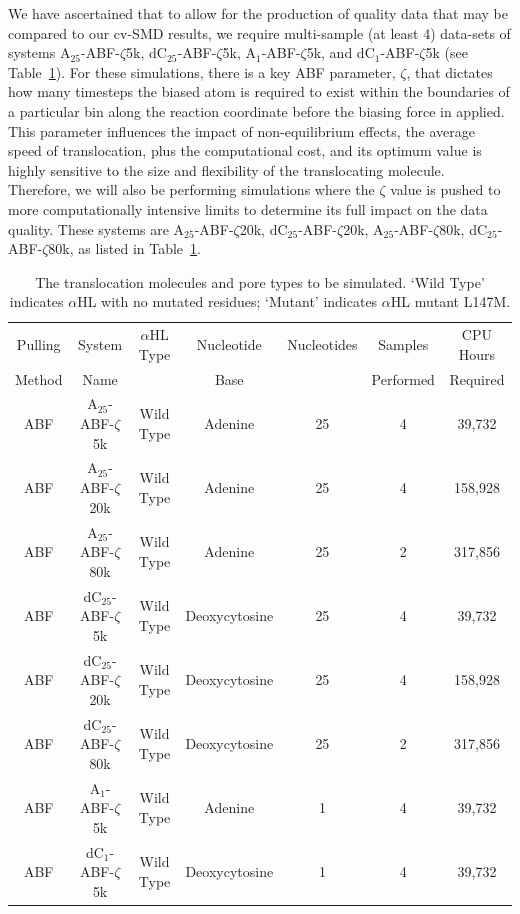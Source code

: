 \documentclass[a4paper,10pt]{article}
\newcommand{\dctfnsp}{dC$_{25}$}
\newcommand{\atfnsp}{A$_{25}$}
\newcommand{\dconsp}{dC$_{1}$}
\newcommand{\aonsp}{A$_{1}$}
\newcommand{\ahl}{$\alpha$HL }
\begin{document}
We have ascertained that to allow for the production of quality data that may be compared to our cv-SMD results, we require multi-sample (at least 4) data-sets of systems  \atfnsp-ABF-$\zeta$5k, \dctfnsp-ABF-$\zeta$5k,  \aonsp-ABF-$\zeta$5k,  and \dconsp-ABF-$\zeta$5k (see Table~\ref{table:systems2}). For these simulations, there is a key ABF parameter, $\zeta$, that dictates how many timesteps the biased atom is required to exist within the boundaries of a particular bin along the reaction coordinate before the biasing force in applied. This parameter influences the impact of non-equilibrium effects, the average speed of translocation, plus the computational cost, and its optimum value is highly sensitive to the size and flexibility of the translocating molecule. Therefore, we will also be performing simulations where the $\zeta$ value is pushed to more computationally intensive limits to determine its full impact on the data quality. These systems are \atfnsp-ABF-$\zeta$20k, \dctfnsp-ABF-$\zeta$20k,  \atfnsp-ABF-$\zeta$80k, \dctfnsp-ABF-$\zeta$80k, as listed in Table~\ref{table:systems2}.


\begin{table}[!h]
\begin{center}
  \caption{The translocation molecules and pore types to be simulated. `Wild Type' indicates \ahl with no mutated residues; `Mutant' indicates \ahl mutant L147M.\newline }
\label{table:systems2}
\begin{tabular}{| c | c | c | c | c | c | c |}
\hline
Pulling & System & \ahl Type & Nucleotide & Nucleotides & Samples & CPU Hours \\
Method & Name &  & Base &  & Performed & Required\\
\hline
ABF & \atfnsp-ABF-$\zeta$5k & Wild Type & Adenine & 25 & 4 & 39,732 \\
ABF & \atfnsp-ABF-$\zeta$20k & Wild Type & Adenine & 25 & 4 & 158,928 \\
ABF & \atfnsp-ABF-$\zeta$80k & Wild Type & Adenine & 25 & 2  & 317,856 \\
ABF & \dctfnsp-ABF-$\zeta$5k & Wild Type & Deoxycytosine & 25 & 4 & 39,732 \\
ABF & \dctfnsp-ABF-$\zeta$20k & Wild Type & Deoxycytosine & 25 & 4 & 158,928  \\
ABF & \dctfnsp-ABF-$\zeta$80k & Wild Type & Deoxycytosine & 25 & 2 & 317,856 \\
ABF & \aonsp-ABF-$\zeta$5k & Wild Type & Adenine & 1 & 4 &  39,732 \\
ABF & \dconsp-ABF-$\zeta$5k & Wild Type & Deoxycytosine & 1 & 4 & 39,732 \\
\hline
\end{tabular}
\end{center}
\end{table}
\end{document}
